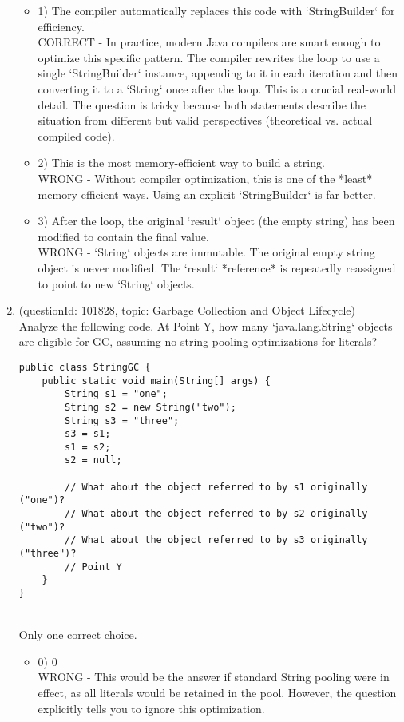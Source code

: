 \documentclass[12pt]{article}
\begin{document}
\begin{enumerate}[label=(\arabic*)]
\begin{itemize}
\item 1) The compiler automatically replaces this code with `StringBuilder` for efficiency.
 \\ 
CORRECT - In practice, modern Java compilers are smart enough to optimize this specific pattern. The compiler rewrites the loop to use a single `StringBuilder` instance, appending to it in each iteration and then converting it to a `String` once after the loop. This is a crucial real-world detail. The question is tricky because both statements describe the situation from different but valid perspectives (theoretical vs. actual compiled code).

\item 2) This is the most memory-efficient way to build a string.
 \\ 
WRONG - Without compiler optimization, this is one of the *least* memory-efficient ways. Using an explicit `StringBuilder` is far better.

\item 3) After the loop, the original `result` object (the empty string) has been modified to contain the final value.
 \\ 
WRONG - `String` objects are immutable. The original empty string object is never modified. The `result` *reference* is repeatedly reassigned to point to new `String` objects.

\end{itemize}
\item (questionId: 101828, topic: Garbage Collection and Object Lifecycle) \\ 
Analyze the following code. At Point Y, how many `java.lang.String` objects are eligible for GC, assuming no string pooling optimizations for literals?
\begin{verbatim}
public class StringGC {
    public static void main(String[] args) {
        String s1 = "one";
        String s2 = new String("two");
        String s3 = "three";
        s3 = s1;
        s1 = s2;
        s2 = null;

        // What about the object referred to by s1 originally ("one")?
        // What about the object referred to by s2 originally ("two")?
        // What about the object referred to by s3 originally ("three")?
        // Point Y
    }
}
\end{verbatim}
\\ \noindent Only one correct choice. 
\begin{itemize}
\item 0) 0
 \\ 
WRONG - This would be the answer if standard String pooling were in effect, as all literals would be retained in the pool. However, the question explicitly tells you to ignore this optimization.


\end{itemize}
\end{enumerate}
\end{document}
